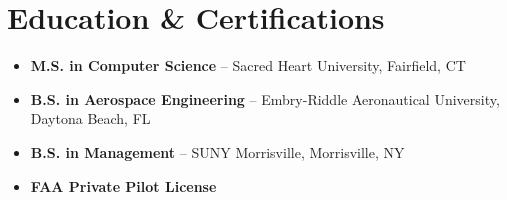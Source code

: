 

\section*{Education \& Certifications}
\begin{itemize}
    \item \textbf{M.S. in Computer Science} – Sacred Heart University, Fairfield, CT
    \item \textbf{B.S. in Aerospace Engineering} – Embry-Riddle Aeronautical University, Daytona Beach, FL
    \item \textbf{B.S. in Management} – SUNY Morrisville, Morrisville, NY
    \item \textbf{FAA Private Pilot License}
\end{itemize}